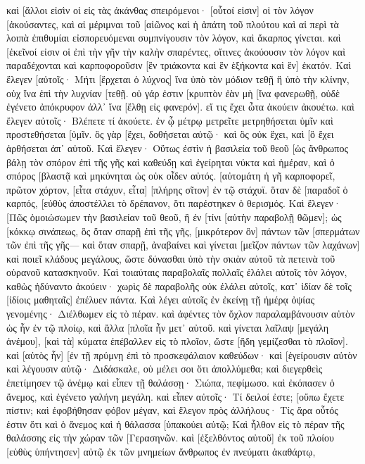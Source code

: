καὶ [ἄλλοι εἰσὶν οἱ εἰς τὰς ἀκάνθας σπειρόμενοι· [οὗτοί εἰσιν] οἱ τὸν λόγον [ἀκούσαντες, 
καὶ αἱ μέριμναι τοῦ [αἰῶνος καὶ ἡ ἀπάτη τοῦ πλούτου καὶ αἱ περὶ τὰ λοιπὰ ἐπιθυμίαι εἰσπορευόμεναι συμπνίγουσιν τὸν λόγον, καὶ ἄκαρπος γίνεται. 
καὶ [ἐκεῖνοί εἰσιν οἱ ἐπὶ τὴν γῆν τὴν καλὴν σπαρέντες, οἵτινες ἀκούουσιν τὸν λόγον καὶ παραδέχονται καὶ καρποφοροῦσιν [ἓν τριάκοντα καὶ ἓν ἑξήκοντα καὶ ἓν] ἑκατόν. 
Καὶ ἔλεγεν [αὐτοῖς· Μήτι [ἔρχεται ὁ λύχνος] ἵνα ὑπὸ τὸν μόδιον τεθῇ ἢ ὑπὸ τὴν κλίνην, οὐχ ἵνα ἐπὶ τὴν λυχνίαν [τεθῇ. 
οὐ γάρ ἐστιν [κρυπτὸν ἐὰν μὴ [ἵνα φανερωθῇ, οὐδὲ ἐγένετο ἀπόκρυφον ἀλλ᾽ ἵνα [ἔλθῃ εἰς φανερόν]. 
εἴ τις ἔχει ὦτα ἀκούειν ἀκουέτω. 
καὶ ἔλεγεν αὐτοῖς· Βλέπετε τί ἀκούετε. ἐν ᾧ μέτρῳ μετρεῖτε μετρηθήσεται ὑμῖν καὶ προστεθήσεται [ὑμῖν. 
ὃς γὰρ [ἔχει, δοθήσεται αὐτῷ· καὶ ὃς οὐκ ἔχει, καὶ [ὃ ἔχει ἀρθήσεται ἀπ᾽ αὐτοῦ. 
Καὶ ἔλεγεν· Οὕτως ἐστὶν ἡ βασιλεία τοῦ θεοῦ [ὡς ἄνθρωπος βάλῃ τὸν σπόρον ἐπὶ τῆς γῆς 
καὶ καθεύδῃ καὶ ἐγείρηται νύκτα καὶ ἡμέραν, καὶ ὁ σπόρος [βλαστᾷ καὶ μηκύνηται ὡς οὐκ οἶδεν αὐτός. 
[αὐτομάτη ἡ γῆ καρποφορεῖ, πρῶτον χόρτον, [εἶτα στάχυν, εἶτα] [πλήρης σῖτον] ἐν τῷ στάχυϊ. 
ὅταν δὲ [παραδοῖ ὁ καρπός, [εὐθὺς ἀποστέλλει τὸ δρέπανον, ὅτι παρέστηκεν ὁ θερισμός. 
Καὶ ἔλεγεν· [Πῶς ὁμοιώσωμεν τὴν βασιλείαν τοῦ θεοῦ, ἢ ἐν [τίνι [αὐτὴν παραβολῇ θῶμεν]; 
ὡς [κόκκῳ σινάπεως, ὃς ὅταν σπαρῇ ἐπὶ τῆς γῆς, [μικρότερον ὂν] πάντων τῶν [σπερμάτων τῶν ἐπὶ τῆς γῆς— 
καὶ ὅταν σπαρῇ, ἀναβαίνει καὶ γίνεται [μεῖζον πάντων τῶν λαχάνων] καὶ ποιεῖ κλάδους μεγάλους, ὥστε δύνασθαι ὑπὸ τὴν σκιὰν αὐτοῦ τὰ πετεινὰ τοῦ οὐρανοῦ κατασκηνοῦν. 
Καὶ τοιαύταις παραβολαῖς πολλαῖς ἐλάλει αὐτοῖς τὸν λόγον, καθὼς ἠδύναντο ἀκούειν· 
χωρὶς δὲ παραβολῆς οὐκ ἐλάλει αὐτοῖς, κατ᾽ ἰδίαν δὲ τοῖς [ἰδίοις μαθηταῖς] ἐπέλυεν πάντα. 
Καὶ λέγει αὐτοῖς ἐν ἐκείνῃ τῇ ἡμέρᾳ ὀψίας γενομένης· Διέλθωμεν εἰς τὸ πέραν. 
καὶ ἀφέντες τὸν ὄχλον παραλαμβάνουσιν αὐτὸν ὡς ἦν ἐν τῷ πλοίῳ, καὶ ἄλλα [πλοῖα ἦν μετ᾽ αὐτοῦ. 
καὶ γίνεται λαῖλαψ [μεγάλη ἀνέμου], [καὶ τὰ] κύματα ἐπέβαλλεν εἰς τὸ πλοῖον, ὥστε [ἤδη γεμίζεσθαι τὸ πλοῖον]. 
καὶ [αὐτὸς ἦν] [ἐν τῇ πρύμνῃ ἐπὶ τὸ προσκεφάλαιον καθεύδων· καὶ [ἐγείρουσιν αὐτὸν καὶ λέγουσιν αὐτῷ· Διδάσκαλε, οὐ μέλει σοι ὅτι ἀπολλύμεθα; 
καὶ διεγερθεὶς ἐπετίμησεν τῷ ἀνέμῳ καὶ εἶπεν τῇ θαλάσσῃ· Σιώπα, πεφίμωσο. καὶ ἐκόπασεν ὁ ἄνεμος, καὶ ἐγένετο γαλήνη μεγάλη. 
καὶ εἶπεν αὐτοῖς· Τί δειλοί ἐστε; [οὔπω ἔχετε πίστιν; 
καὶ ἐφοβήθησαν φόβον μέγαν, καὶ ἔλεγον πρὸς ἀλλήλους· Τίς ἄρα οὗτός ἐστιν ὅτι καὶ ὁ ἄνεμος καὶ ἡ θάλασσα [ὑπακούει αὐτῷ; 
Καὶ ἦλθον εἰς τὸ πέραν τῆς θαλάσσης εἰς τὴν χώραν τῶν [Γερασηνῶν. 
καὶ [ἐξελθόντος αὐτοῦ] ἐκ τοῦ πλοίου [εὐθὺς ὑπήντησεν] αὐτῷ ἐκ τῶν μνημείων ἄνθρωπος ἐν πνεύματι ἀκαθάρτῳ, 
